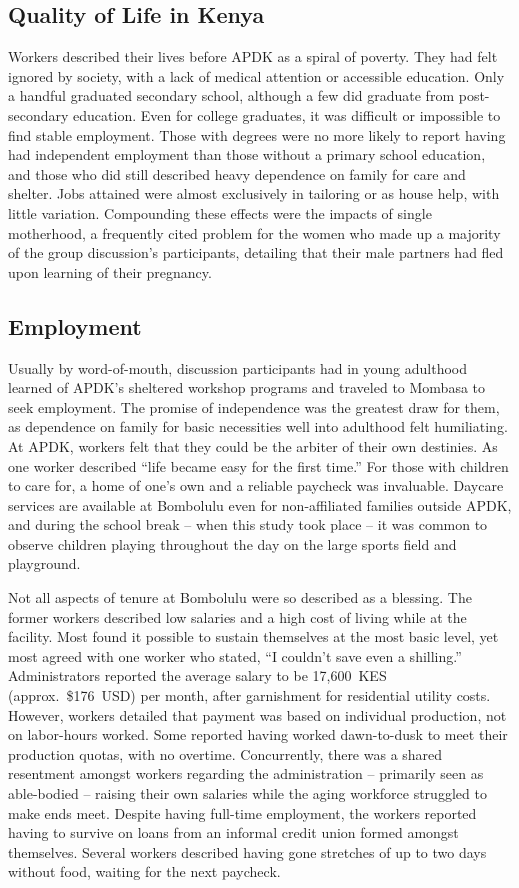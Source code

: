 \documentclass{../../../coursework}
\begin{document}
\subsection{Quality of Life in Kenya}

Workers described their lives before APDK as a spiral of poverty. They had
felt ignored by society, with a lack of medical attention or accessible
education. Only a handful graduated secondary school, although a few did
graduate from post-secondary education. Even for college graduates,
it was difficult or impossible to find stable employment. Those with degrees
were no more likely to report having had independent employment than those
without a primary school education, and those who did still described heavy
dependence on family for care and shelter. Jobs attained were almost
exclusively in tailoring or as house help, with little variation. Compounding
these effects were the impacts of single motherhood, a frequently cited
problem for the women who made up a majority of the group discussion's
participants, detailing that their male partners had fled upon learning of
their pregnancy.

\subsection{Employment}

Usually by word-of-mouth, discussion participants had in young adulthood
learned of APDK's sheltered workshop programs and traveled to Mombasa to seek
employment. The promise of independence was the greatest draw for them, as
dependence on family for basic necessities well into adulthood felt
humiliating. At APDK, workers felt that they could be the arbiter of their own
destinies. As one worker described ``life became easy for the first time.''
For those with children to care for, a home of one's own and a reliable
paycheck was invaluable. Daycare services are available at Bombolulu even for
non-affiliated families outside APDK, and during the school break -- when this
study took place -- it was common to observe children playing throughout the
day on the large sports field and playground.

Not all aspects of tenure at Bombolulu were so described as a blessing. The
former workers described low salaries and a high cost of living while at the
facility. Most found it possible to sustain themselves at the most basic
level, yet most agreed with one worker who stated, ``I couldn't save even a
shilling.'' Administrators reported the average salary to be 17,600~KES
(approx.~\$176~USD) per month, after garnishment for residential utility
costs. However, workers detailed that payment was based on individual
production, not on labor-hours worked. Some reported having worked
dawn-to-dusk to meet their production quotas, with no overtime. Concurrently,
there was a shared resentment amongst workers regarding the administration --
primarily seen as able-bodied -- raising their own salaries while the aging
workforce struggled to make ends meet. Despite having full-time employment,
the workers reported having to survive on loans from an informal credit union
formed amongst themselves. Several workers described having gone stretches of
up to two days without food, waiting for the next paycheck.
\end{document}
